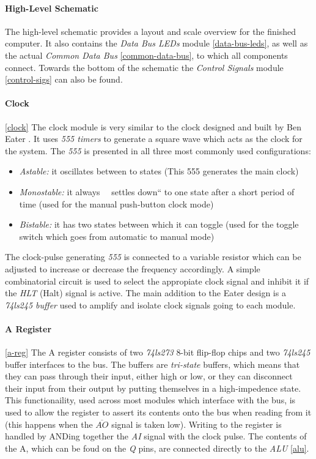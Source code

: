 \paragraph{High-Level Schematic}
The high-level schematic provides a layout and scale overview for the finished computer. It also contains the \emph{Data Bus LEDs}
module \ref{data-bus-leds}, as well as the actual \emph{Common Data Bus} \ref{common-data-bus}, to which all components connect.
Towards the bottom of the schematic the \emph{Control Signals} module \ref{control-sigs} can also be found.


\clearpage

\paragraph{Clock} \ref{clock}
The clock module is very similar to the clock designed and built by Ben Eater \cite{eater2020clock}. It uses \emph{555 timers}
\cite{555} to generate a square wave which acts as the clock for the system. The \emph{555} is presented in all three most commonly
used configurations:
\begin{itemize}
  \item \emph{Astable: } it oscillates between to states (This 555 generates the main clock)
  \item \emph{Monostable: } it always ~~settles down`` to one state after a short period of time (used for the manual push-button
  clock mode)
  \item \emph{Bistable: } it has two states between which it can toggle (used for the toggle switch which goes from automatic to
  manual mode)
\end{itemize}
The clock-pulse generating \emph{555} is connected to a variable resistor which can be adjusted to increase or decrease the
frequency accordingly. A simple combinatorial circuit is used to select the appropiate clock signal and inhibit it if the \emph{HLT}
 (Halt) signal is active. The main addition to the Eater design is a \emph{74ls245 buffer} \cite{74ls245} used to amplify and
 isolate clock signals going to each module.

 

\paragraph{A Register} \ref{a-reg}
The A register consists of two \emph{74ls273} \cite{74ls273} 8-bit flip-flop chips and two \emph{74ls245} \cite{74ls245} buffer
interfaces to the bus. The buffers are \emph{tri-state} buffers, which means that they can pass through their input, either high or
low, or they can  disconnect their input from their output by putting themselves in a high-impedence state. This functionaility,
used across most modules which interface with the bus, is used to allow the register to assert its contents onto the bus when
reading from it (this happens when the \emph{$\overline{AO}$} signal is taken low). Writing to the register is handled by
ANDing together the \emph{AI} signal with the clock pulse. The contents of the A, which can be foud on the \emph{Q} pins, are
connected directly to the \emph{ALU} \ref{alu}.

